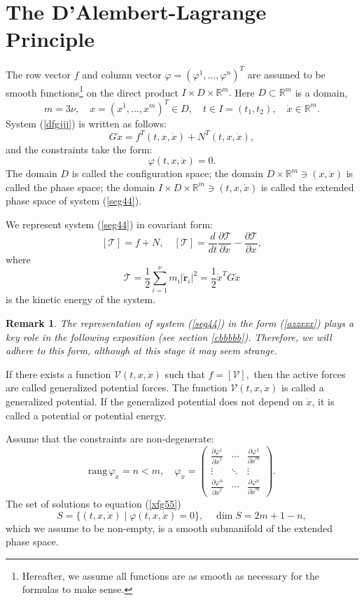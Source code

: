 \documentclass[reqno,12pt]{amsproc}
\newtheorem{rem}{Remark}
\newcommand\ph\varphi
\begin{document}
\section{The D'Alembert-Lagrange Principle}
The row vector $f$ and column vector $\ph=(\ph^1,\ldots,\ph^n)^T$ are assumed to be smooth functions\footnote{Hereafter, we assume all functions are as smooth as necessary for the formulas to make sense.} on the direct product $I\times D\times \mathbb{R}^m.$ Here $D\subset\mathbb{R}^m$ is a domain, $$ m=3\nu,\quad x=(x^1,\ldots, x^m)^T\in D,\quad t\in I=(t_1,t_2),\quad \dot x\in\mathbb{R}^m.$$
System (\ref{dfgjjj}) is written as follows:
\begin{equation}\label{seg44}
G\ddot x=f^T(t,x,\dot x)+N^T(t,x,\dot x),\end{equation}
and the constraints take the form:
\begin{equation}\label{xfg55}
\ph(t,x,\dot x)=0.\end{equation}
The domain $D$ is called the configuration space; the domain $D\times\mathbb{R}^m\ni (x,\dot x)$ is called the phase space; the domain $I\times D\times\mathbb{R}^m\ni (t,x,\dot x)$ is called the extended phase space of system (\ref{seg44}).



We represent system (\ref{seg44}) in covariant form:
\begin{equation}\label{azzxxx}[\mathscr T]=f+N,\quad[\mathscr T]= \frac{d}{dt}\frac{\partial\mathscr{T}}{\partial \dot x}-\frac{\partial\mathscr{T}}{\partial  x}, \end{equation}
where
$$\mathscr T=\frac{1}{2}\sum_{i=1}^\nu m_i|\boldsymbol {\dot r}_i|^2=\frac{1}{2}\dot x^TG\dot x$$
is the kinetic energy of the system.
\begin{rem}The representation of system (\ref{seg44}) in the form (\ref{azzxxx})
plays a key role in the following exposition (see section \ref{cbbbbb}). Therefore, we will adhere to this form, although at this stage it may seem strange.\end{rem}



If there exists a function $\mathscr V(t,x,\dot x)$ such that
$f=[\mathscr{V}],$
then the active forces are called generalized potential forces.
The function $\mathscr V(t,x,\dot x)$ is called a generalized potential.
If the generalized potential does not depend on $\dot x$, it is called a potential or potential energy.



Assume that the constraints are non-degenerate:
$$ \mathrm{rang}\,\ph_{\dot x}=n<m,\quad\ph_{\dot x}=\begin{pmatrix}
\frac{\partial \ph^1}{\partial \dot x^1}  & \cdots & \frac{\partial \ph^1}{\partial \dot x^m} \\
\vdots    & \ddots & \vdots  \\
\frac{\partial \ph^n}{\partial \dot x^1} & \cdots & \frac{\partial \ph^n}{\partial \dot x^m}
\end{pmatrix}.$$
The set of solutions to equation (\ref{xfg55})
$$S=\{(t,x,\dot x)\mid\ph(t,x,\dot x)=0\},\quad \dim S=2m+1-n,$$ which we assume to be non-empty, is a smooth submanifold of the extended phase space.
\end{document}

